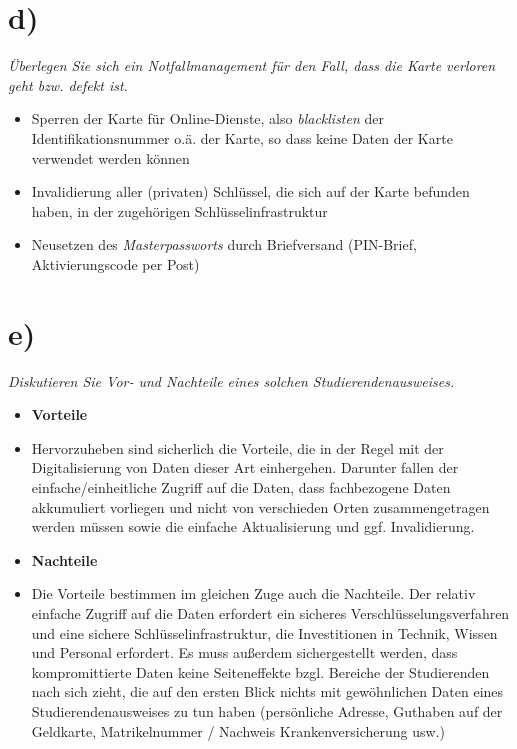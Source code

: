 \section{d)}

\textit{Überlegen Sie sich ein Notfallmanagement für den Fall, dass die Karte verloren
geht bzw. defekt ist.}\\



\begin{itemize}
    \item Sperren der Karte für Online-Dienste, also \textit{blacklisten} der Identifikationsnummer o.ä. der Karte, so dass keine Daten der Karte verwendet werden können
    \item Invalidierung aller (privaten) Schlüssel, die sich auf der Karte befunden haben, in der zugehörigen Schlüsselinfrastruktur
    \item Neusetzen des \textit{Masterpassworts} durch Briefversand (PIN-Brief, Aktivierungscode per Post)
\end{itemize}


\section{e)}

\textit{Diskutieren Sie Vor‐ und Nachteile eines solchen Studierendenausweises.}\\


\begin{itemize}
    \itemsep0.5em
    \item \textbf{Vorteile}
        \item[] Hervorzuheben sind sicherlich die Vorteile, die in der Regel mit der Digitalisierung von Daten dieser Art einhergehen.
        Darunter fallen der einfache/einheitliche Zugriff auf die Daten, dass fachbezogene Daten akkumuliert vorliegen und nicht von verschieden Orten zusammengetragen werden müssen sowie die einfache Aktualisierung und ggf. Invalidierung.
    \item \textbf{Nachteile}
        \item[] Die Vorteile bestimmen im gleichen Zuge auch die Nachteile.
    Der relativ einfache Zugriff auf die Daten erfordert ein sicheres Verschlüsselungsverfahren und eine sichere Schlüsselinfrastruktur, die Investitionen in Technik, Wissen und Personal erfordert.
    Es muss außerdem sichergestellt werden, dass kompromittierte Daten keine Seiteneffekte bzgl. Bereiche der Studierenden nach sich zieht, die auf den ersten Blick nichts mit gewöhnlichen Daten eines Studierendenausweises zu tun haben (persönliche Adresse, Guthaben auf der Geldkarte, Matrikelnummer / Nachweis Krankenversicherung usw.)
\end{itemize}














